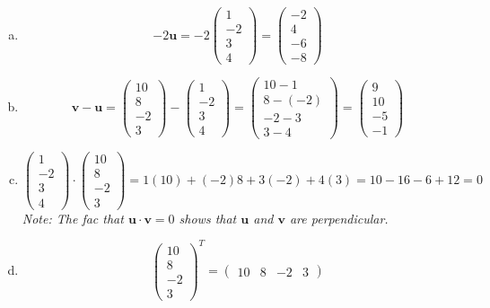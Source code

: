 \documentclass[11pt,letterpaper]{article}
\begin{document}
\sol 
\begin{enumerate}[(a)]
\item 
	\[
	-2\mathbf{u}= -2 \begin{pmatrix} 1 \\ -2 \\ 3 \\ 4 \end{pmatrix}= \begin{pmatrix} -2 \\ 4 \\ -6 \\ -8 \end{pmatrix}
	\]

\item 
	\[
	\mathbf{v} - \mathbf{u}= \begin{pmatrix} 10 \\ 8 \\ -2 \\ 3 \end{pmatrix} - \begin{pmatrix} 1 \\ -2 \\ 3 \\ 4 \end{pmatrix}= \begin{pmatrix} 10 - 1 \\ 8 - (-2) \\ -2 - 3 \\ 3 - 4 \end{pmatrix}= \begin{pmatrix} 9 \\ 10 \\ -5 \\ -1 \end{pmatrix}
	\]

\item 
	\[
	\begin{pmatrix} 1 \\ -2 \\ 3 \\ 4 \end{pmatrix} \cdot \begin{pmatrix} 10 \\ 8 \\ -2 \\ 3 \end{pmatrix}= 1(10) + (-2) 8 + 3(-2) + 4(3)= 10 - 16 - 6 + 12= 0
	\] 
{\itshape Note: The fac that $\mathbf{u} \cdot \mathbf{v}= 0$ shows that $\mathbf{u}$ and $\mathbf{v}$ are perpendicular.} 

\item 
	\[
	\begin{pmatrix} 10 \\ 8 \\ -2 \\ 3 \end{pmatrix}^T= \begin{pmatrix} 10 & 8 & -2 & 3 \end{pmatrix}
	\]
\end{enumerate}
\end{document}
